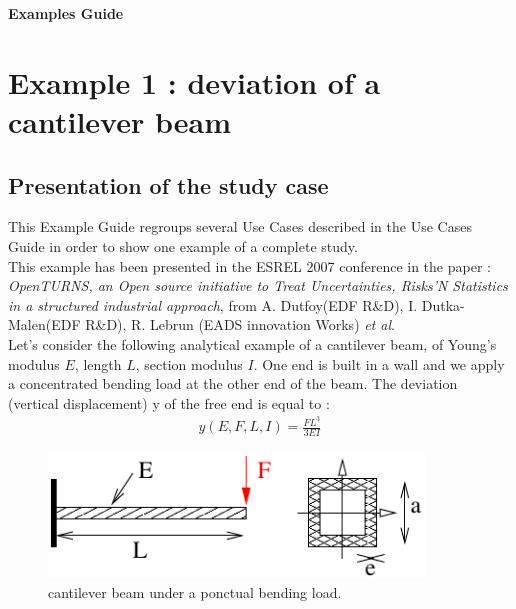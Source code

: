 \documentclass[11pt]{article}
\begin{document}
\begin{titlepage}
  \vspace*{2cm}
  \begin{center}
    {\huge \bf Examples Guide}
    
  \end{center}

\end{titlepage}
\newpage
\tableofcontents


\newpage
\section{Example 1 : deviation of a cantilever beam}

\subsection{Presentation of the study case}

This Example Guide regroups several Use Cases described in the Use Cases Guide in order to show one example of a complete study. \\

This example has been presented in the ESREL 2007 conference in the paper : {\itshape OpenTURNS, an Open source initiative to Treat Uncertainties, Risks'N Statistics in a structured industrial approach}, from A. Dutfoy(EDF R\&D), I. Dutka-Malen(EDF R\&D), R. Lebrun (EADS innovation Works) \emph{et al}.\\

Let's consider the following analytical example of a cantilever beam, of Young's modulus $E$, length $L$, section modulus $I$. One end is built in a wall and we apply a concentrated bending load at the other end of the beam. The deviation (vertical displacement) y of the free end is equal to :
\begin{align*}
  y(E, F, L, I) = \frac{FL^3}{3EI}
\end{align*}

\begin{figure}[Hhbtp]
  \begin{center}
    \includegraphics[width=10cm]{Figures/poutre.pdf}
  \end{center}
  \caption{cantilever beam under a ponctual bending load.}
\end{figure}
\end{document}
